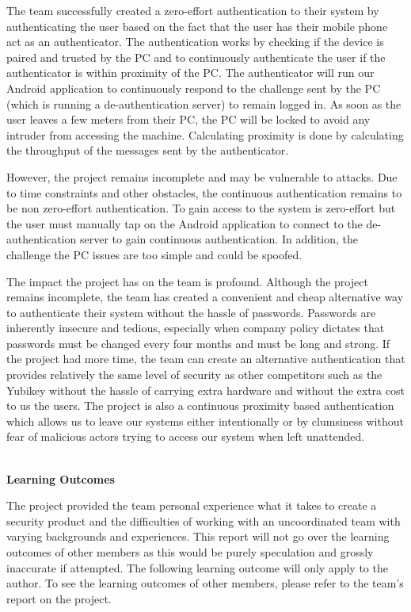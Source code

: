 \documentclass[letterpaper,twocolumn,10pt]{article}
\begin{document}
{{The team successfully created a zero-effort authentication to their system by authenticating the user based on the fact that the user has their mobile phone act as an authenticator. The authentication works by checking if the device is paired and trusted by the PC and to continuously authenticate the user if the authenticator is within proximity of the PC. The authenticator will run our Android application to continuously respond to the challenge sent by the PC (which is running a de-authentication server) to remain logged in. As soon as the user leaves a few meters from their PC, the PC will be locked to avoid any intruder from accessing the machine. Calculating proximity is done by calculating the throughput of the messages sent by the authenticator. 

However, the project remains incomplete and may be vulnerable to attacks. Due to time constraints and other obstacles, the continuous authentication remains to be non zero-effort authentication. To gain access to the system is zero-effort but the user must manually tap on the Android application to connect to the de-authentication server to gain continuous authentication. In addition, the challenge the PC issues are too simple and could be spoofed.

The impact the project has on the team is profound. Although the project remains incomplete, the team has created a convenient and cheap alternative way to authenticate their system without the hassle of passwords. Passwords are inherently insecure and tedious, especially when company policy dictates that passwords must be changed every four months and must be long and strong. If the project had more time, the team can create an alternative authentication that provides relatively the same level of security as other competitors such as the Yubikey without the hassle of carrying extra hardware and without the extra cost to us the users. The project is also a continuous proximity based authentication which allows us to leave our systems either intentionally or by clumsiness without fear of malicious actors trying to access our system when left unattended. 

\hrulefill\\
\large \textbf{Learning Outcomes}

\normalsize
The project provided the team personal experience what it takes to create a security product and the difficulties of working with an uncoordinated team with varying backgrounds and experiences. This report will not go over the learning outcomes of other members as this would be purely speculation and grossly inaccurate if attempted. The following learning outcome will only apply to the author. To see the learning outcomes of other members, please refer to the team's report on the project.

}}
\end{document}

